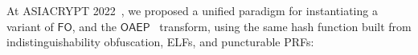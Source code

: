 
At ASIACRYPT 2022~\cite{AC:MurONeZah22}, we proposed a unified paradigm for instantiating a variant of  $\mathsf{FO}$, and the $\mathsf{OAEP}$~\cite{EC:BelRog94} transform, using the same hash function built from indistinguishability obfuscation, ELFs, and puncturable PRFs:  %
